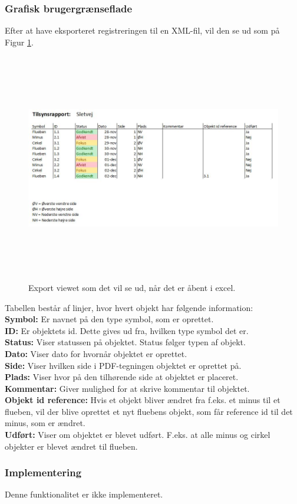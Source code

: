 \subsubsection{Grafisk brugergrænseflade}
Efter at have eksporteret registreringen til en XML-fil, vil den se ud som på Figur \ref{fig:Excel}.
\begin{figure}[H] %
	\centering
	\includegraphics[height=10cm, width=17cm]{../ArkitekturDesign/Design/Eksportering/Excel}
	\caption{Export viewet som det vil se ud, når det er åbent i excel.}
	\label{fig:Excel}
\end{figure}
Tabellen består af linjer, hvor hvert objekt har følgende information: \\
\textbf{Symbol:} Er navnet på den type symbol, som er oprettet. \\
\textbf{ID:} Er objektets id. Dette gives ud fra, hvilken type symbol det er. \\
\textbf{Status:} Viser statussen på objektet. Status følger typen af objekt. \\
\textbf{Dato:} Viser dato for hvornår objektet er oprettet. \\
\textbf{Side:} Viser hvilken side i PDF-tegningen objektet er oprettet på. \\
\textbf{Plads:} Viser hvor på den tilhørende side at objektet er placeret. \\
\textbf{Kommentar:} Giver mulighed for at skrive kommentar til objektet. \\
\textbf{Objekt id reference:} Hvis et objekt bliver ændret fra f.eks. et minus til et flueben, vil der blive oprettet et nyt fluebens objekt, som får reference id til det minus, som er ændret. \\
\textbf{Udført:} Viser om objektet er blevet udført. F.eks. at alle minus og cirkel objekter er blevet ændret til flueben. \\

\subsubsection{Implementering}
Denne funktionalitet er ikke implementeret.

\clearpage